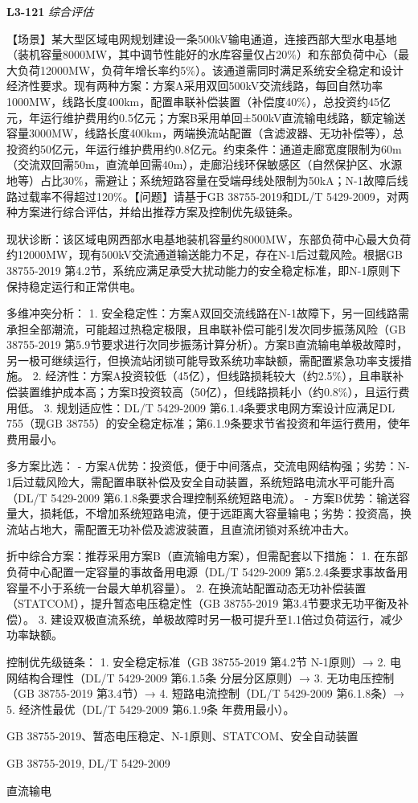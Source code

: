 \documentclass[12pt,a4paper]{ctexart}
\begin{document}
\noindent\textbf{L3-121} \hfill \textit{综合评估}
\begin{description}[leftmargin=1.5em,style=nextline,font=\normalfont]
  \item[Q:] 【场景】某大型区域电网规划建设一条500kV输电通道，连接西部大型水电基地（装机容量8000MW，其中调节性能好的水库容量仅占20\%）和东部负荷中心（最大负荷12000MW，负荷年增长率约5\%）。该通道需同时满足系统安全稳定和设计经济性要求。现有两种方案：方案A采用双回500kV交流线路，每回自然功率1000MW，线路长度400km，配置串联补偿装置（补偿度40\%），总投资约45亿元，年运行维护费用约0.5亿元；方案B采用单回±500kV直流输电线路，额定输送容量3000MW，线路长度400km，两端换流站配置（含滤波器、无功补偿等），总投资约50亿元，年运行维护费用约0.8亿元。约束条件：通道走廊宽度限制为60m（交流双回需50m，直流单回需40m），走廊沿线环保敏感区（自然保护区、水源地等）占比30\%，需避让；系统短路容量在受端母线处限制为50kA；N-1故障后线路过载率不得超过120\%。【问题】请基于GB 38755-2019和DL/T 5429-2009，对两种方案进行综合评估，并给出推荐方案及控制优先级链条。
  \item[A:] 现状诊断：该区域电网西部水电基地装机容量约8000MW，东部负荷中心最大负荷约12000MW，现有500kV交流通道输送能力不足，存在N-1后过载风险。根据GB 38755-2019 第4.2节，系统应满足承受大扰动能力的安全稳定标准，即N-1原则下保持稳定运行和正常供电。

多维冲突分析：
1. 安全稳定性：方案A双回交流线路在N-1故障下，另一回线路需承担全部潮流，可能超过热稳定极限，且串联补偿可能引发次同步振荡风险（GB 38755-2019 第5.9节要求进行次同步振荡计算分析）。方案B直流输电单极故障时，另一极可继续运行，但换流站闭锁可能导致系统功率缺额，需配置紧急功率支援措施。
2. 经济性：方案A投资较低（45亿），但线路损耗较大（约2.5\%），且串联补偿装置维护成本高；方案B投资较高（50亿），但线路损耗小（约0.8\%），且运行费用低。
3. 规划适应性：DL/T 5429-2009 第6.1.4条要求电网方案设计应满足DL 755（现GB 38755）的安全稳定标准；第6.1.9条要求节省投资和年运行费用，使年费用最小。

多方案比选：
- 方案A优势：投资低，便于中间落点，交流电网结构强；劣势：N-1后过载风险大，需配置串联补偿及安全自动装置，系统短路电流水平可能升高（DL/T 5429-2009 第6.1.8条要求合理控制系统短路电流）。
- 方案B优势：输送容量大，损耗低，不增加系统短路电流，便于远距离大容量输电；劣势：投资高，换流站占地大，需配置无功补偿及滤波装置，且直流闭锁对系统冲击大。

折中综合方案：推荐采用方案B（直流输电方案），但需配套以下措施：
1. 在东部负荷中心配置一定容量的事故备用电源（DL/T 5429-2009 第5.2.4条要求事故备用容量不小于系统一台最大单机容量）。
2. 在换流站配置动态无功补偿装置（STATCOM），提升暂态电压稳定性（GB 38755-2019 第3.4节要求无功平衡及补偿）。
3. 建设双极直流系统，单极故障时另一极可提升至1.1倍过负荷运行，减少功率缺额。

控制优先级链条：
1. 安全稳定标准（GB 38755-2019 第4.2节 N-1原则）→ 2. 电网结构合理性（DL/T 5429-2009 第6.1.5条 分层分区原则）→ 3. 无功电压控制（GB 38755-2019 第3.4节）→ 4. 短路电流控制（DL/T 5429-2009 第6.1.8条）→ 5. 经济性最优（DL/T 5429-2009 第6.1.9条 年费用最小）。
  \item[KW:] GB 38755-2019、暂态电压稳定、N-1原则、STATCOM、安全自动装置
  \item[Std:] GB 38755-2019, DL/T 5429-2009
  \item[Topic:] 直流输电
\end{description}
\end{document}
